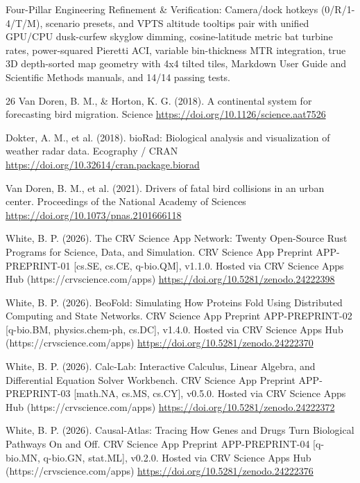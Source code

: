 \documentclass[10pt,letterpaper]{article}
\begin{document}
Four-Pillar Engineering Refinement \& Verification: Camera/dock hotkeys (0/R/1-4/T/M), scenario presets, and VPTS altitude tooltips pair with unified GPU/CPU dusk-curfew skyglow dimming, cosine-latitude metric bat turbine rates, power-squared Pieretti ACI, variable bin-thickness MTR integration, true 3D depth-sorted map geometry with 4x4 tilted tiles, Markdown User Guide and Scientific Methods manuals, and 14/14 passing tests.

\begin{thebibliography}{26}
 Van Doren, B. M., \& Horton, K. G. (2018). A continental system for forecasting bird migration. Science \url{https://doi.org/10.1126/science.aat7526}

 Dokter, A. M., et al. (2018). bioRad: Biological analysis and visualization of weather radar data. Ecography / CRAN \url{https://doi.org/10.32614/cran.package.biorad}

 Van Doren, B. M., et al. (2021). Drivers of fatal bird collisions in an urban center. Proceedings of the National Academy of Sciences \url{https://doi.org/10.1073/pnas.2101666118}

 White, B. P. (2026). The CRV Science App Network: Twenty Open-Source Rust Programs for Science, Data, and Simulation. CRV Science App Preprint APP-PREPRINT-01 [cs.SE, cs.CE, q-bio.QM], v1.1.0. Hosted via CRV Science Apps Hub (https://crvscience.com/apps) \url{https://doi.org/10.5281/zenodo.24222398}

 White, B. P. (2026). BeoFold: Simulating How Proteins Fold Using Distributed Computing and State Networks. CRV Science App Preprint APP-PREPRINT-02 [q-bio.BM, physics.chem-ph, cs.DC], v1.4.0. Hosted via CRV Science Apps Hub (https://crvscience.com/apps) \url{https://doi.org/10.5281/zenodo.24222370}

 White, B. P. (2026). Calc-Lab: Interactive Calculus, Linear Algebra, and Differential Equation Solver Workbench. CRV Science App Preprint APP-PREPRINT-03 [math.NA, cs.MS, cs.CY], v0.5.0. Hosted via CRV Science Apps Hub (https://crvscience.com/apps) \url{https://doi.org/10.5281/zenodo.24222372}

 White, B. P. (2026). Causal-Atlas: Tracing How Genes and Drugs Turn Biological Pathways On and Off. CRV Science App Preprint APP-PREPRINT-04 [q-bio.MN, q-bio.GN, stat.ML], v0.2.0. Hosted via CRV Science Apps Hub (https://crvscience.com/apps) \url{https://doi.org/10.5281/zenodo.24222376}


\end{thebibliography}
\end{document}
